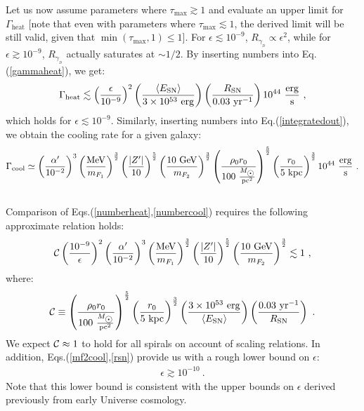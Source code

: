 \documentclass[12pt]{article}
\begin{document}
{{Let us now assume parameters where $\tau _{\max} \gtrsim 1$ and evaluate
an upper limit for $\Gamma _{\text{heat}}$ [note that even with
parameters where $\tau _{\max} \lesssim 1$, the derived limit will be
still valid, given that $\min (\tau _{\max},1) \leq 1$]. For $\epsilon
\lesssim 10 ^{-9}$, $R _{\gamma _{_D}} \propto \epsilon ^2$, while for
$\epsilon \gtrsim 10 ^{-9}$, $R _{\gamma _{_D}}$ actually saturates at
$\sim 1/2$. By inserting numbers into Eq.(\ref{gammaheat}), we get:
%
\begin{eqnarray}
\Gamma _{\text{heat}} \lesssim \left (\frac{\epsilon}{10 ^{-9}} \right )
^2\left (\frac{\langle E _{\text{SN}} \rangle}{3 \times 10 ^{53} \ \rm
erg} \right )\left (\frac{R _{\text{SN}}}{0.03 \ \rm yr ^{-1}} \right )
10 ^{44} \ \rm \frac{erg}{s} \ ,
\label{numberheat}
\end{eqnarray}
%
which holds for $\epsilon \lesssim 10 ^{-9}$. Similarly, inserting
numbers into Eq.(\ref{integratedout}), we obtain the cooling rate for a
given galaxy:
%
\begin{eqnarray}
\Gamma _{\text{cool}} \simeq \left (\frac{\alpha '}{10 ^{-2}} \right )
^3\left (\frac{\rm MeV}{m _{F_1}} \right ) ^{\frac{3}{2}}\left (
\frac{|Z'|}{10} \right ) ^{\frac{5}{2}}\left (\frac{10 \ \rm GeV}{m
_{F_2}} \right ) ^{\frac{3}{2}}\left (\frac{\rho _0r _0}{100 \ \frac{M
_{\astrosun}}{\rm pc ^2}} \right ) ^{\frac{5}{2}}\left (\frac{r _0}{5 \
\rm kpc} \right ) ^{\frac{3}{2}} 10 ^{44} \ \rm \frac{erg}{s} \ .
\nonumber \\
~ 
\label{numbercool}
\end{eqnarray}
%
Comparison of Eqs.(\ref{numberheat},\ref{numbercool}) requires the
following approximate relation holds:
%
\begin{eqnarray}
{\cal C}\left (\frac{10 ^{-9}}{\epsilon} \right ) ^2\left (\frac{\alpha
'}{10 ^{-2}} \right ) ^3\left (\frac{\rm MeV}{m _{F_1}} \right )
^{\frac{3}{2}}\left (\frac{|Z'|}{10} \right ) ^{\frac{5}{2}}\left
(\frac{10 \ \rm GeV}{m _{F_2}} \right ) ^{\frac{3}{2}} \lesssim 1 \ ,
\label{rsn}
\end{eqnarray}
%
where:
%
\begin{eqnarray}
{\cal C} \equiv \left (\frac{\rho _0r _0}{100 \ \frac{M
_{\astrosun}}{\rm pc ^2}} \right ) ^{\frac{5}{2}}\left (\frac{r _0}{5 \
\rm kpc} \right ) ^{\frac{3}{2}}\left (\frac{3 \times 10 ^{53} \ \rm
erg}{\langle E _{\text{SN}} \rangle} \right )\left ( \frac{0.03 \ \rm yr
^{-1}}{R _{\text{SN}}} \right ) \ .
\label{calc}
\end{eqnarray}
%
We expect ${\cal C} \approx 1$ to hold for all spirals on account of
scaling relations. In addition, Eqs.(\ref{mf2cool},\ref{rsn}) provide us
with a
rough lower bound on $\epsilon$:
%
\begin{eqnarray}
\epsilon \gtrsim 10 ^{-10} \ .
\label{boundepsilon}
\end{eqnarray}
%
Note that this lower bound is consistent with the upper bounds on
$\epsilon$ derived previously from early Universe cosmology.

}}
\end{document}
